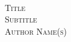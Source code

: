 \begin{titlepage}
	\pagestyle{empty} %
	\begin{center}
		\textsc{}\\[5cm]
		\textsc{\Large Title}\\[2.5cm]
		\textsc{\Large Subtitle}\\[0.5cm]
		\textsc{Author Name(s)}\\[0.5cm]
	\end{center}
\end{titlepage}
